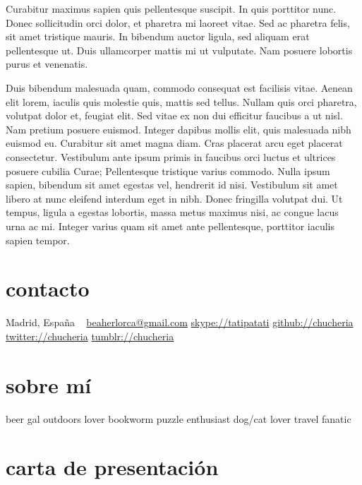 \documentclass[]{friggeri-cv}
\begin{document}
    Curabitur maximus sapien quis pellentesque suscipit. In quis porttitor nunc. Donec sollicitudin orci dolor, et pharetra mi laoreet vitae. Sed ac pharetra felis, sit amet tristique mauris. In bibendum auctor ligula, sed aliquam erat pellentesque ut. Duis ullamcorper mattis mi ut vulputate. Nam posuere lobortis purus et venenatis.
    
    Duis bibendum malesuada quam, commodo consequat est facilisis vitae. Aenean elit lorem, iaculis quis molestie quis, mattis sed tellus. Nullam quis orci pharetra, volutpat dolor et, feugiat elit. Sed vitae ex non dui efficitur faucibus a ut nisl. Nam pretium posuere euismod. Integer dapibus mollis elit, quis malesuada nibh euismod eu. Curabitur sit amet magna diam. Cras placerat arcu eget placerat consectetur. Vestibulum ante ipsum primis in faucibus orci luctus et ultrices posuere cubilia Curae; Pellentesque tristique varius commodo. Nulla ipsum sapien, bibendum sit amet egestas vel, hendrerit id nisi. Vestibulum sit amet libero at nunc eleifend interdum eget in nibh. Donec fringilla volutpat dui. Ut tempus, ligula a egestas lobortis, massa metus maximus nisi, ac congue lacus urna ac mi. Integer varius quam sit amet ante pellentesque, porttitor iaculis sapien tempor.


\else 

       {}


\begin{aside}
  \section{contacto}
    Madrid, España
    ~
    \href{mailto:beaherlorca@gmail.com}{beaherlorca@gmail.com}
    \href{skype:<tatipatati>[add]}{skype://tatipatati}
    \href{https://github.com/chucheria}{github://chucheria}
    \href{https://twitter.com/chucheria}{twitter://chucheria}
    \href{http://chucheria.tumblr.com/}{tumblr://chucheria}
  \section{sobre mí}
    beer gal
    outdoors lover
    bookworm
    puzzle enthusiast
    dog/cat lover
    travel fanatic
\end{aside}

\section{carta de presentación}
\end{document}
